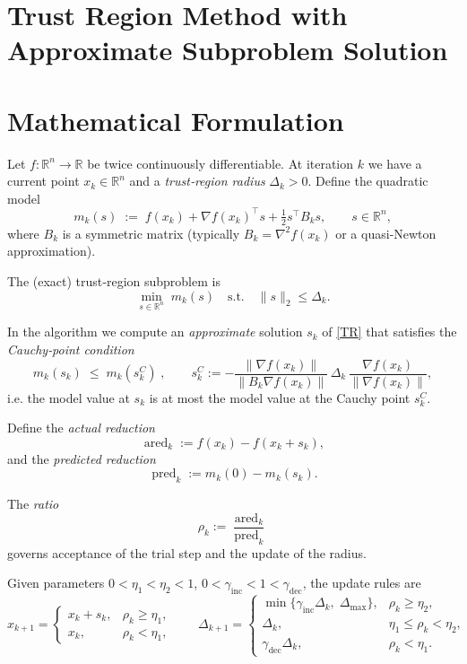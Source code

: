 \documentclass{article}
\newcommand{\RR}{\mathbb{R}}
\begin{document}
\section*{Trust Region Method with Approximate Subproblem Solution}

\section*{Mathematical Formulation}
Let $f:\RR^{n}\rightarrow\RR$ be twice continuously differentiable.  
At iteration $k$ we have a current point $x_k\in\RR^{n}$ and a \emph{trust‑region radius} $\Delta_k>0$.  
Define the quadratic model
\[
m_k(s)\;:=\;f(x_k)+\nabla f(x_k)^{\top}s+\tfrac12 s^{\top}B_k s,
\qquad s\in\RR^{n},
\]
where $B_k$ is a symmetric matrix (typically $B_k=\nabla^{2}f(x_k)$ or a quasi‑Newton approximation).  

The (exact) trust‑region subproblem is
\[
\min_{s\in\RR^{n}}\; m_k(s)\quad\text{s.t.}\quad \|s\|_2\le \Delta_k .
\tag{TR}
\]

In the algorithm we compute an \emph{approximate} solution $s_k$ of \eqref{TR} that satisfies the \emph{Cauchy‑point condition}
\[
m_k(s_k)\;\le\;m_k(s_k^{C})\;,
\qquad 
s_k^{C}:=-\frac{\|\nabla f(x_k)\|}{\|B_k\nabla f(x_k)\|}\,\Delta_k\,\frac{\nabla f(x_k)}{\|\nabla f(x_k)\|},
\tag{C}
\]
i.e. the model value at $s_k$ is at most the model value at the Cauchy point $s_k^{C}$.

Define the \emph{actual reduction}
\[
\operatorname{ared}_k:=f(x_k)-f(x_k+s_k),
\]
and the \emph{predicted reduction}
\[
\operatorname{pred}_k:=m_k(0)-m_k(s_k).
\]

The \emph{ratio}
\[
\rho_k:=\frac{\operatorname{ared}_k}{\operatorname{pred}_k}
\tag{R}
\]
governs acceptance of the trial step and the update of the radius.  

Given parameters $0<\eta_1<\eta_2<1$, $0<\gamma_{\text{inc}}<1<\gamma_{\text{dec}}$, the update rules are
\[
x_{k+1}= 
\begin{cases}
x_k+s_k, & \rho_k\ge \eta_1,\\[2mm]
x_k, & \rho_k<\eta_1,
\end{cases}
\qquad
\Delta_{k+1}= 
\begin{cases}
\min\{\gamma_{\text{inc}}\Delta_k,\;\Delta_{\max}\}, & \rho_k\ge \eta_2,\\[2mm]
\Delta_k, & \eta_1\le\rho_k<\eta_2,\\[2mm]
\gamma_{\text{dec}}\Delta_k, & \rho_k<\eta_1.
\end{cases}
\tag{U}
\]
\end{document}
